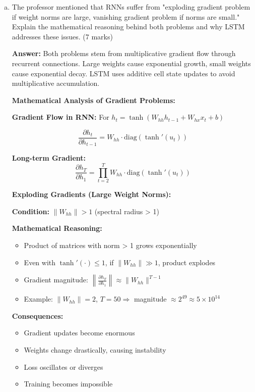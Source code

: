 \documentclass[12pt]{article}
\newcommand{\answer}[1]{{\color{answercolor}\textbf{Answer:} #1}}
\newcommand{\explanation}[1]{{\color{explanationcolor}#1}}
\begin{document}
\begin{enumerate}[(a)]
    \item The professor mentioned that RNNs suffer from "exploding gradient problem if weight norms are large, vanishing gradient problem if norms are small." Explain the mathematical reasoning behind both problems and why LSTM addresses these issues. \hfill (7 marks)
    
    \answer{Both problems stem from multiplicative gradient flow through recurrent connections. Large weights cause exponential growth, small weights cause exponential decay. LSTM uses additive cell state updates to avoid multiplicative accumulation.}
    
    \explanation{
    \textbf{Mathematical Analysis of Gradient Problems:}
    
    \textbf{Gradient Flow in RNN:}
    For $h_t = \tanh(W_{hh} h_{t-1} + W_{hx} x_t + b)$
    
    $$\frac{\partial h_t}{\partial h_{t-1}} = W_{hh} \cdot \text{diag}(\tanh'(u_t))$$
    
    \textbf{Long-term Gradient:}
    $$\frac{\partial h_T}{\partial h_1} = \prod_{t=2}^T W_{hh} \cdot \text{diag}(\tanh'(u_t))$$
    
    \textbf{Exploding Gradients (Large Weight Norms):}
    
    \textbf{Condition:} $\|W_{hh}\| > 1$ (spectral radius > 1)
    
    \textbf{Mathematical Reasoning:}
    \begin{itemize}
        \item Product of matrices with norm > 1 grows exponentially
        \item Even with $\tanh'(\cdot) \leq 1$, if $\|W_{hh}\| \gg 1$, product explodes
        \item Gradient magnitude: $\left\|\frac{\partial h_T}{\partial h_1}\right\| \approx \|W_{hh}\|^{T-1}$
        \item Example: $\|W_{hh}\| = 2$, $T = 50 \Rightarrow$ magnitude $\approx 2^{49} \approx 5 \times 10^{14}$
    \end{itemize}
    
    \textbf{Consequences:}
    \begin{itemize}
        \item Gradient updates become enormous
        \item Weights change drastically, causing instability
        \item Loss oscillates or diverges
        \item Training becomes impossible
    \end{itemize}
    
}
\end{enumerate}
\end{document}
